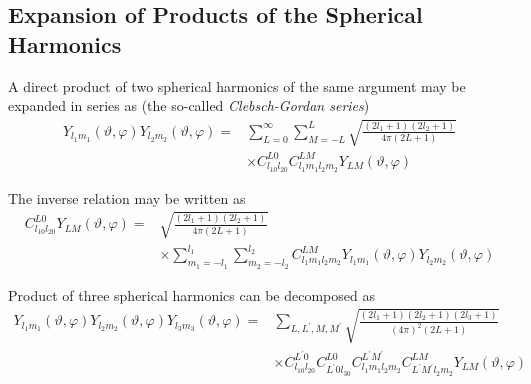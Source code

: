 \subsection{Expansion of Products of the Spherical Harmonics}
\par{A direct product of two spherical harmonics of the same argument may be
  expanded in series as (the so-called {\it Clebsch-Gordan series})}
\begin{equation}
\label{product2}
\begin{split}
Y_{l_1m_1}(\vartheta,\varphi)Y_{l_2m_2}(\vartheta,\varphi)=&\sum_{L=0}^{\infty}\sum_{M=-L}^{L}\sqrt{\frac{(2l_1+1)(2l_2+1)}{4\pi(2L+1)}}\\&\times C_{l_10l_20}^{L0}C_{l_1m_1l_2m_2}^{LM}Y_{LM}(\vartheta,\varphi)
\end{split}
\end{equation}
\par{The inverse relation may be written as}
\begin{equation}
\begin{split}
C_{l_10l_20}^{L0}Y_{LM}(\vartheta,\varphi)=&\sqrt{\frac{(2l_1+1)(2l_2+1)}{4\pi(2L+1)}}\\&\times\sum_{m_1=-l_1}^{l_1}\sum_{m_2=-l_2}^{l_2}C_{l_1m_1l_2m_2}^{LM}Y_{l_1m_1}(\vartheta,\varphi)Y_{l_2m_2}(\vartheta,\varphi)
\end{split}
\end{equation}
\par{Product of three spherical harmonics can be decomposed as}
\begin{equation*}
\begin{split}
Y_{l_1m_1}(\vartheta,\varphi)Y_{l_2m_2}(\vartheta,\varphi)Y_{l_3m_3}(\vartheta,\varphi)=&\sum_{L,L^{\prime},M,M^{\prime}}\sqrt{\frac{(2l_1+1)(2l_2+1)(2l_3+1)}{(4\pi)^2(2L+1)}}\\&\times C_{l_10l_20}^{L^{\prime}0}C_{L^{\prime}0l_30}^{L0}
C_{l_1m_1l_2m_2}^{L^{\prime}M^{\prime}}C_{L^{\prime}M^{\prime}l_2m_2}^{LM}Y_{LM}(\vartheta,\varphi)
\end{split}
\end{equation*}
